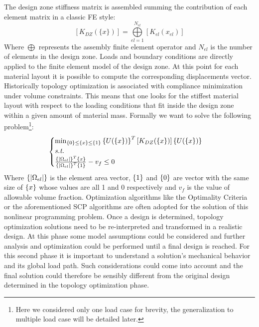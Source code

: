 The design zone stiffness matrix is assembled summing the contribution of each element matrix in a classic FE style:
\begin{equation}
\label{eq.8}
\left[K_{DZ}(\lbrace x\rbrace)\right]=\overset{N_{el}}{\underset{el=1}{\bigoplus}}\left[K_{el}(x_{el})\right]
\end{equation}
Where $\bigoplus$ represents the assembly finite element operator and $N_{el}$ is the number of elements in the design zone.
Loads and boundary conditions are directly applied to the finite element model of the design zone. At this point for each material layout it is possible to compute the corresponding displacements vector. Historically topology optimization is associated with compliance minimization under volume constraints. This means that one looks for the stiffest material layout with respect to the loading conditions that fit inside the design zone within a given amount of material mass.
Formally we want to solve the following problem\footnote{Here we considered only one load case for brevity, the generalization to multiple load case will be detailed later.}:
\begin{equation}
\label{compl_formulation}
\begin{cases}
\min_{\left\lbrace{0}\right \rbrace\leq\left\lbrace{x}\right \rbrace\leq\left\lbrace{1}\right \rbrace} {\left\lbrace{U(\lbrace x\rbrace)}\right \rbrace^T\left[K_{DZ}(\lbrace x\rbrace)\right]\left\lbrace{U(\lbrace x\rbrace)}\right \rbrace} \\
\textit{s.t.}\\
\frac{\left\lbrace{|\Omega_{el}|}\right \rbrace^T\left\lbrace{x}\right \rbrace}{\left\lbrace{|\Omega_{el}|}\right \rbrace^T\left\lbrace{1}\right \rbrace}-v_f\leq 0
\end{cases}
\end{equation}
Where $\left\lbrace{|\Omega_{el}|}\right \rbrace$ is the element area vector, $\left\lbrace{1}\right \rbrace$ and $\left\lbrace{0}\right \rbrace$ are vector with the same size of $\left\lbrace{x}\right \rbrace$ whose values are all 1 and 0 respectively and $v_f$ is the value of allowable volume fraction. Optimization algorithms like the Optimality Criteria \cite{bendsoe1995optimization} or the aforementioned SCP algorithms \cite{svanberg1987method} are often adopted for the solution of this nonlinear programming problem. Once a design is determined, topology optimization solutions need to be re-interpreted and transformed in a realistic design. At this phase some model assumptions could be considered and further analysis and optimization could be performed until a final design is reached. For this second phase it is important to understand a solution's mechanical behavior and its global load path. Such considerations could come into account and the final solution could therefore be sensibly different from the original design determined in the topology optimization phase.
\clearpage
